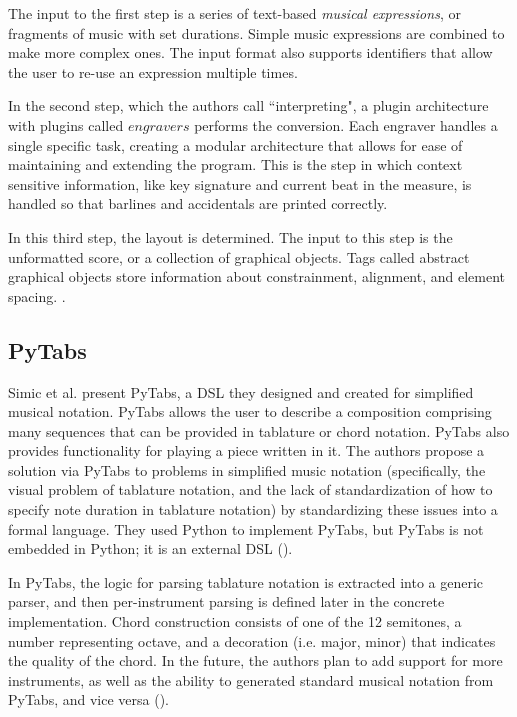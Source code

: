 \documentclass{report}
\newcommand\citeparen[1]{(\cite{#1})}
\begin{document}
The input to the first step is a series of text-based \textit{musical expressions}, or fragments of music with set durations. Simple music expressions are combined to make more complex ones. The input format also supports identifiers that allow the user to re-use an expression multiple times.

In the second step, which the authors call ``interpreting", a plugin architecture with plugins called $engravers$ performs the conversion. Each engraver handles a single specific task, creating a modular architecture that allows for ease of maintaining and extending the program. This is the step in which context sensitive information, like key signature and current beat in the measure, is handled so that barlines and accidentals are printed correctly.

In this third step, the layout is determined. The input to this step is the unformatted score, or a collection of graphical objects. Tags called abstract graphical objects store information about constrainment, alignment, and element spacing. 
\cite{nienhuys_nieuwenhuizen_2003}.

\subsection{PyTabs}
Simic et al. present  PyTabs, a  DSL  they designed and  created  for  simplified musical notation. PyTabs allows the user  to describe a composition comprising many  sequences that  can  be  provided in tablature or chord notation. PyTabs also provides functionality for playing a piece written in it. The authors propose a solution via PyTabs to problems in  simplified  music notation (specifically,  the  visual problem of  tablature  notation, and the lack of  standardization of how  to specify note duration in tablature notation) by  standardizing these issues into a formal language. They used Python to  implement  PyTabs, but PyTabs is not  embedded  in  Python;  it is an external  DSL \citeparen{simic_bal_dejanovic_vaderna}.

In PyTabs, the  logic for parsing tablature  notation is extracted into a  generic parser, and then per-instrument parsing is defined  later in the concrete implementation. Chord construction consists  of one of the 12 semitones, a number representing  octave, and a decoration (i.e. major, minor) that indicates the quality of the  chord.  In the future, the authors plan to add support for more instruments, as  well as the ability to generated standard musical notation from PyTabs,  and  vice versa \citeparen{simic_bal_dejanovic_vaderna}.
\end{document}
